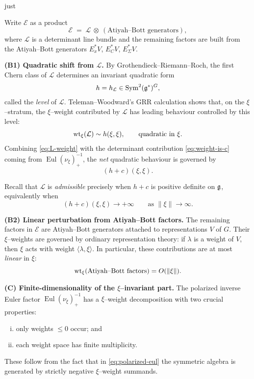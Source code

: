 just \documentclass[12pt]{article}
\DeclareMathOperator{\Eul}{Eul}
\begin{document}
Write $\mathcal E$ as a product
\[
\mathcal E \;=\; \mathcal L\ \otimes\ (\text{Atiyah--Bott generators}),
\]
where $\mathcal L$ is a determinant line bundle and the remaining factors are
built from the Atiyah--Bott generators $E_x^*V$, $E_C^*V$, $E_\Sigma^*V$.

\medskip
\noindent\textbf{(B1) Quadratic shift from $\mathcal L$.}
By Grothendieck--Riemann--Roch, the first Chern class of $\mathcal L$ determines
an invariant quadratic form
\[
h=h_{\mathcal L}\in \operatorname{Sym}^2(\mathfrak{g}^*)^G,
\]
called the \emph{level} of $\mathcal L$.  Teleman--Woodward's GRR calculation
shows that, on the $\xi$--stratum, the $\xi$--weight contributed by $\mathcal L$
has leading behaviour controlled by this level:
\begin{equation}
\label{eq:L-weight}
\operatorname{wt}_\xi(\mathcal L)\sim h(\xi,\xi),
\qquad\text{quadratic in }\xi.
\end{equation}
Combining \eqref{eq:L-weight} with the determinant contribution
\eqref{eq:weight-is-c} coming from $\Eul(\nu_\xi)^{-1}_+$, the \emph{net} quadratic
behaviour is governed by
\begin{equation}
\label{eq:h-plus-c}
(h+c)(\xi,\xi).
\end{equation}

Recall that $\mathcal L$ is \emph{admissible} precisely when $h+c$ is positive
definite on $\mathfrak{g}$, equivalently when
\[
(h+c)(\xi,\xi)\to +\infty\qquad\text{as }\|\xi\|\to\infty.
\]

\medskip
\noindent\textbf{(B2) Linear perturbation from Atiyah--Bott factors.}
The remaining factors in $\mathcal E$ are Atiyah--Bott generators attached to
representations $V$ of $G$.  Their $\xi$--weights are governed by ordinary
representation theory: if $\lambda$ is a weight of $V$, then $\xi$ acts with
weight $\langle\lambda,\xi\rangle$.  In particular, these contributions are at
most \emph{linear} in $\xi$:
\begin{equation}
\label{eq:AB-linear}
\operatorname{wt}_\xi(\text{Atiyah--Bott factors}) = O(\|\xi\|).
\end{equation}

\medskip
\noindent\textbf{(C) Finite-dimensionality of the $\xi$--invariant part.}
The polarized inverse Euler factor $\Eul(\nu_\xi)^{-1}_+$ has a $\xi$--weight
decomposition with two crucial properties:
\begin{enumerate}[(i)]
\item only weights $\le 0$ occur; and
\item each weight space has finite multiplicity.
\end{enumerate}
These follow from the fact that in \eqref{eq:polarized-eul} the symmetric algebra
is generated by strictly negative $\xi$--weight summands.
\end{document}
